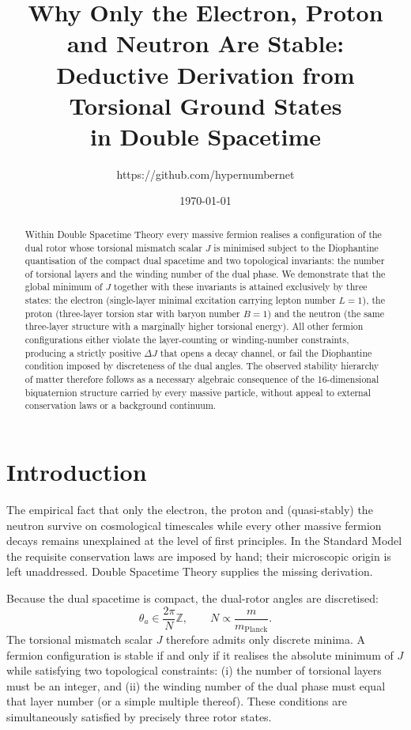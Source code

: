 \documentclass[a4paper]{article}
\title{Why Only the Electron, Proton and Neutron Are Stable:\\
Deductive Derivation from Torsional Ground States\\
in Double Spacetime}
\author{https://github.com/hypernumbernet}
\date{\today}
\begin{document}
\maketitle

\begin{abstract}
Within Double Spacetime Theory every massive fermion realises a configuration of the dual rotor whose torsional mismatch scalar \(J\) is minimised subject to the Diophantine quantisation of the compact dual spacetime and two topological invariants: the number of torsional layers and the winding number of the dual phase. We demonstrate that the global minimum of \(J\) together with these invariants is attained exclusively by three states: the electron (single-layer minimal excitation carrying lepton number \(L=1\)), the proton (three-layer torsion star with baryon number \(B=1\)) and the neutron (the same three-layer structure with a marginally higher torsional energy). All other fermion configurations either violate the layer-counting or winding-number constraints, producing a strictly positive \(\Delta J\) that opens a decay channel, or fail the Diophantine condition imposed by discreteness of the dual angles. The observed stability hierarchy of matter therefore follows as a necessary algebraic consequence of the 16-dimensional biquaternion structure carried by every massive particle, without appeal to external conservation laws or a background continuum.

\end{abstract}

\section{Introduction}

The empirical fact that only the electron, the proton and (quasi-stably) the neutron survive on cosmological timescales while every other massive fermion decays remains unexplained at the level of first principles. In the Standard Model the requisite conservation laws are imposed by hand; their microscopic origin is left unaddressed. Double Spacetime Theory supplies the missing derivation.

Because the dual spacetime is compact, the dual-rotor angles are discretised:
\[
\theta_a\in\frac{2\pi}{N}\mathbb{Z},\qquad N\propto\frac{m}{m_\text{Planck}}.
\]
The torsional mismatch scalar \(J\) therefore admits only discrete minima. A fermion configuration is stable if and only if it realises the absolute minimum of \(J\) while satisfying two topological constraints: (i) the number of torsional layers must be an integer, and (ii) the winding number of the dual phase must equal that layer number (or a simple multiple thereof). These conditions are simultaneously satisfied by precisely three rotor states.
\end{document}
